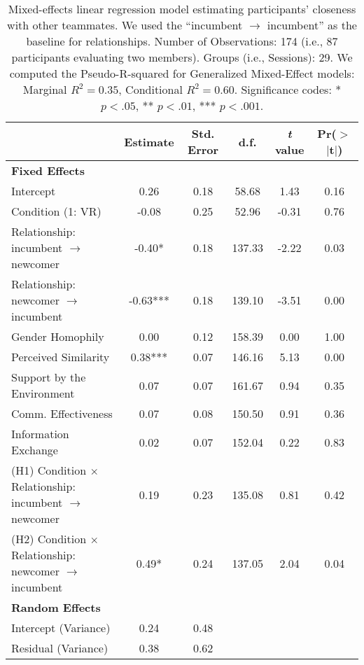 \begin{table*}[ht]
\centering
\small
\begin{tabular}{lccccc}
  \hline
 & \textbf{Estimate} & \textbf{Std. Error} & \textbf{d.f.} & \textbf{\textit{t} value} & \textbf{Pr($>$$|$t$|$)} \\ 
  \hline
  \textbf{Fixed Effects} & & & & & \\
  Intercept & 0.26 & 0.18 & 58.68 & 1.43 & 0.16 \\ 
  Condition (1: VR) & -0.08 & 0.25 & 52.96 & -0.31 & 0.76 \\ 
  Relationship: incumbent $\rightarrow$ newcomer & -0.40* & 0.18 & 137.33 & -2.22 & 0.03 \\ 
  Relationship: newcomer $\rightarrow$ incumbent & -0.63*** & 0.18 & 139.10 & -3.51 & 0.00 \\ 
  Gender Homophily & 0.00 & 0.12 & 158.39 & 0.00 & 1.00 \\ 
  Perceived Similarity & 0.38*** & 0.07 & 146.16 & 5.13 & 0.00 \\ 
  Support by the Environment & 0.07 & 0.07 & 161.67 & 0.94 & 0.35 \\ 
  Comm. Effectiveness & 0.07 & 0.08 & 150.50 & 0.91 & 0.36 \\ 
  Information Exchange & 0.02 & 0.07 & 152.04 & 0.22 & 0.83 \\ 
  (H1) Condition $\times$ Relationship: incumbent $\rightarrow$ newcomer & 0.19 & 0.23 & 135.08 & 0.81 & 0.42 \\ 
  (H2) Condition $\times$ Relationship: newcomer $\rightarrow$ incumbent & 0.49* & 0.24 & 137.05 & 2.04 & 0.04 \\ \midrule
  \textbf{Random Effects} & & & & & \\
  Intercept (Variance) & 0.24 & 0.48 & & & \\
  Residual (Variance) & 0.38 & 0.62 & & & \\
   \hline
\end{tabular}
\caption{Mixed-effects linear regression model estimating participants' closeness with other teammates. We used the ``incumbent $\rightarrow$ incumbent'' as the baseline for relationships. Number of Observations: 174 (i.e., 87 participants evaluating two members). Groups (i.e., Sessions): 29. We computed the Pseudo-R-squared for Generalized Mixed-Effect models: Marginal $R^2=0.35$, Conditional $R^2=0.60$. Significance codes: * $p < .05$, ** $p < .01$, *** $p < .001$.}
\label{tab:mixed-effect-closeness}
\end{table*}